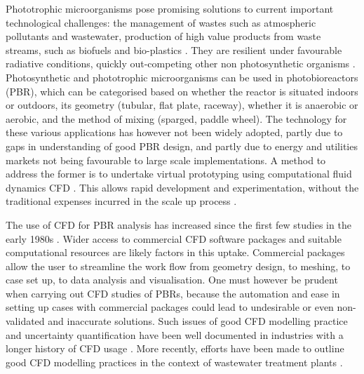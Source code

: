 Phototrophic microorganisms pose promising solutions to current important technological challenges: the management of wastes such as atmospheric pollutants and wastewater, production of high value products from waste streams, such as biofuels and bio-plastics \cite{Hulsen2016}. They are resilient under favourable radiative conditions, quickly out-competing other non photosynthetic organisms \cite{Posten2009}. Photosynthetic and phototrophic microorganisms can be used in photobioreactors (PBR), which can be categorised based on whether the reactor is situated indoors or outdoors, its geometry (tubular, flat plate, raceway), whether it is anaerobic or aerobic, and the method of mixing (sparged, paddle wheel). The technology for these various applications has however not been widely adopted, partly due to gaps in understanding of good PBR design, and partly due to energy and utilities markets not being favourable to large scale implementations. A method to address the former is to undertake virtual prototyping using computational fluid dynamics CFD \cite{Bitog2011}. This allows rapid development and experimentation, without the traditional expenses incurred in the scale up process \cite{Bridgeman2012}.
\skippingparagraph

The use of CFD for PBR analysis has increased since the first few studies in the early 1980s \cite{}. Wider access to commercial CFD software packages and suitable computational resources are likely factors in this uptake. Commercial packages allow the user to streamline the work flow from geometry design, to meshing, to case set up, to data analysis and visualisation. One must however be prudent when carrying out CFD studies of PBRs, because the automation and ease in setting up cases with commercial packages could lead to undesirable or even non-validated and inaccurate solutions. Such issues of good CFD modelling practice and uncertainty quantification have been well documented in industries with a longer history of CFD usage \cite{Roache2002,Oberkampf2002,Celik2008,Pelletier2010}.  More recently, efforts have been made to outline good CFD modelling practices in the context of wastewater treatment plants \cite{Wicklein2016}.
\skippingparagraph

